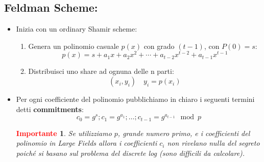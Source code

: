 \documentclass{book}
\newtheorem*{Importante}{\textbf{\textcolor{red}{Importante}}}
\begin{document}
\subsection{Feldman Scheme:\@dealer}
\begin{itemize}
    \item Inizia con un ordinary Shamir scheme:\begin{enumerate}
              \item Genera un polinomio casuale \(p(x)\) con grado \((t-1)\), con \(P(0)=s\):
                    \begin{equation*}
                        p(x)=s+a_{1}x+a_{2}x^{2}+\cdots+a_{t-2}x^{t-2}+a_{t-1}x^{t-1}
                    \end{equation*}
              \item Distribuisci uno share ad ognuna delle n parti:\begin{equation*}
                        (x_{i},y_{i})\quad y_{i}=p(x_{i})
                    \end{equation*}
          \end{enumerate}
    \item Per ogni coefficiente del polinomio pubblichiamo in chiaro i seguenti termini detti \textbf{commitments}:\begin{equation*}
              c_{0}=g^{s};c_{1}=g^{a_{1}};\ldots;c_{t-1}=g^{a_{t-1}}\mod{p}
          \end{equation*}
          \begin{Importante}
              Se utilizziamo \(p\), grande numero primo, e i coefficienti del polinomio in \emph{Large Fields} allora i coefficienti \(c_{i}\) non rivelano nulla del segreto poiché si basano sul problema del discrete log (sono difficili da calcolare).
          \end{Importante}
\end{itemize}
\end{document}
